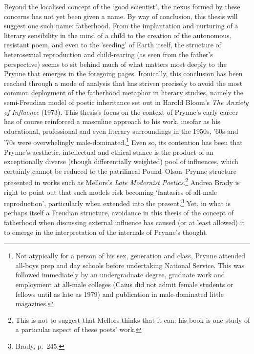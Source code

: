 \documentclass[]{article}
\begin{document}
Beyond the localised concept of the `good scientist', the nexus formed
by these concerns has not yet been given a name. By way of conclusion,
this thesis will suggest one such name: fatherhood. From the
implantation and nurturing of a literary sensibility in the mind of a
child to the creation of the autonomous, resistant poem, and even to the
'seeding' of Earth itself, the structure of heterosexual reproduction
and child-rearing (as seen from the father's perspective) seems to sit
behind much of what matters most deeply to the Prynne that emerges in
the foregoing pages. Ironically, this conclusion has been reached
through a mode of analysis that has striven precisely to avoid the most
common deployment of the fatherhood metaphor in literary studies, namely
the semi-Freudian model of poetic inheritance set out in Harold Bloom's
\emph{The Anxiety of Influence} (1973). This thesis's focus on the
context of Prynne's early career has of course reinforced a masculine
approach to his work, insofar as his educational, professional and even
literary surroundings in the 1950s, '60s and '70s were overwhelingly
male-dominated.\footnote{Not atypically for a person of his sex,
  generation and class, Prynne attended all-boys prep and day schools
  before undertaking National Service. This was followed immediately by
  an undergraduate degree, graduate work and employment at all-male
  colleges (Caius did not admit female students or fellows until as late
  as 1979) and publication in male-dominated little magazines.} Even so,
its contention has been that Prynne's aesthetic, intellectual and
ethical stance is the product of an exceptionally diverse (though
differentially weighted) pool of influences, which certainly cannot be
reduced to the patrilineal Pound--Olson--Prynne structure presented in
works such as Mellors's \emph{Late Modernist Poetics}.\footnote{This is
  not to suggest that Mellors thinks that it can; his book is one study
  of a particular aspect of these poets' work.} Andrea Brady is right to
point out that such models risk becoming `fantasies of all-male
reproduction', particularly when extended into the present.\footnote{Brady,
  p.~245.} Yet, in what is perhaps itself a Freudian structure,
avoidance in this thesis of the concept of fatherhood when discussing
external influence has caused (or at least allowed) it to emerge in the
interpretation of the internals of Prynne's thought.
\end{document}
